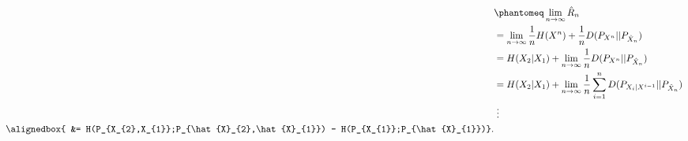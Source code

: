 \documentclass[
  coursecode={MTHE 474},
  assignmentname={Homework \homeworknumber},
  studentnumber=20053722,
  name={Bryan Hoang},
  swappartlabels,
  draft,
]{
  ltxanswer%
}
\begin{document}
\begin{questions}
\begin{parts}
\begin{subparts}
        \subpart{}
        \begin{solution}
          \begin{align*}
                         &\phantomeq \lim_{n\to\infty} \hat{R}_{n}                                                              \\
                         &= \lim_{n\to\infty} \frac{1}{n}H(X^{n}) + \frac{1}{n}D(P_{X^{n}}||P_{\hat{X}_{n}})                    \\
                         &= H(X_{2}|X_{1}) + \lim_{n\to\infty} \frac{1}{n} D(P_{X^{n}}||P_{\hat{X}_{n}})                        \\
                         &= H(X_{2}|X_{1}) + \lim_{n\to\infty} \frac{1}{n} \sum_{i=1}^{n} D(P_{X_{i}|X^{i-1}}||P_{\hat{X}_{n}}) \\
                         &\;\vdots                                                                                              \\
            \alignedbox{ &= H(P_{X_{2},X_{1}};P_{\hat{X}_{2},\hat{X}_{1}}) - H(P_{X_{1}};P_{\hat{X}_{1}})}.
          \end{align*}
        \end{solution}
      \end{subparts}
    \end{parts}
  \end{questions}
\end{document}

